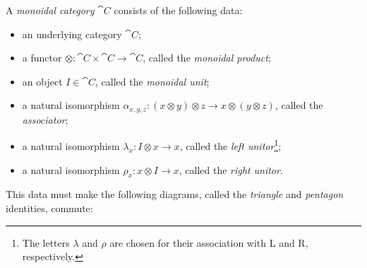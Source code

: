 \begin{dfn}\label{def:monoidal category}
  A \emph{monoidal category} $\cat{C}$ consists of the following data:
  \begin{itemize}
    \item an underlying category $\cat{C}$;
    \item a functor $\otimes: \cat{C}\times\cat{C}\to\cat{C}$, called the
      \emph{monoidal product};
    \item an object $I\in\cat{C}$, called the \emph{monoidal unit};
    \item a natural isomorphism $\alpha_{x,y,z}: (x\otimes y)\otimes z\to
      x\otimes(y\otimes z)$, called the \emph{associator};
    \item a natural isomorphism $\lambda_x: I\otimes x\to x$, called the
      \emph{left unitor}\footnote{The letters $\lambda$ and $\rho$ are chosen
      for their association with L and R, respectively.};
    \item a natural isomorphism $\rho_x: x\otimes I\to x$, called the
      \emph{right unitor}.
  \end{itemize}

  This data must make the following diagrams, called the \emph{triangle} and
  \emph{pentagon} identities, commute:
	\begin{figure}[H]
		\centering
	\end{figure}
\end{dfn}


